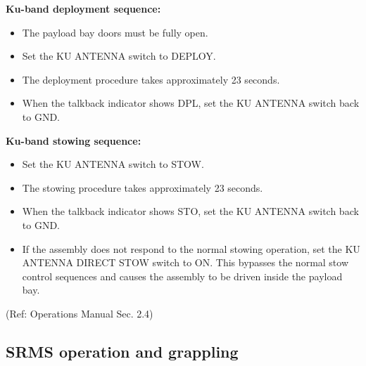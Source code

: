 \textbf{Ku-band deployment sequence:}
\begin{itemize} 
\item The payload bay doors must be fully open.
\item Set the KU ANTENNA switch to DEPLOY.
\item The deployment procedure takes approximately 23 seconds.
\item When the talkback indicator shows DPL, set the KU ANTENNA switch back to GND.
\end{itemize}

\textbf{Ku-band stowing sequence:}
\begin{itemize} 
\item Set the KU ANTENNA switch to STOW.
\item The stowing procedure takes approximately 23 seconds.
\item When the talkback indicator shows STO, set the KU ANTENNA switch back to GND.
\item If the assembly does not respond to the normal stowing operation, set the KU ANTENNA DIRECT STOW switch to ON. This bypasses the normal stow control sequences and causes the assembly to be driven inside the payload bay.
\end{itemize}
(Ref: Operations Manual Sec. 2.4)

\break
\subsection{SRMS operation and grappling}

